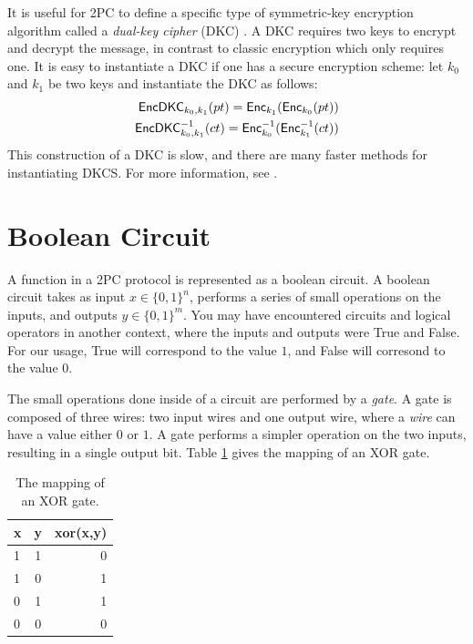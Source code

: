 It is useful for 2PC to define a specific type of symmetric-key encryption algorithm called a \textit{dual-key cipher} (DKC) \cite{bellare2012foundations}.
A DKC requires two keys to encrypt and decrypt the message, in contrast to classic encryption which only requires one.
It is easy to instantiate a DKC if one has a secure encryption scheme: let $k_0$ and $k_1$ be two keys and instantiate the DKC as follows:
\begin{equation}
    \begin{split}
        \textsf{EncDKC}_{k_0, k_1}(pt) = \textsf{Enc}_{k_1} ( \textsf{Enc}_{k_0} ( pt )) \\
        \textsf{EncDKC}^{-1}_{k_0, k_1}(ct) = \textsf{Enc}^{-1}_{k_0} ( \textsf{Enc}^{-1}_{k_1} ( ct )) 
    \end{split}
\end{equation}
This construction of a DKC is slow, and there are many faster methods for instantiating DKCS.
For more information, see \cite{bellare2012foundations}.

\section{Boolean Circuit} 
A function in a 2PC protocol is represented as a boolean circuit.
A boolean circuit takes as input $x \in \{0,1\}^n$, performs a series of small operations on the inputs, and outputs $y \in \{0,1\}^m$.  
You may have encountered circuits and logical operators in another context, where the inputs and outputs were True and False.
For our usage, True will correspond to the value $1$, and False will corresond to the value $0$. 

The small operations done inside of a circuit are performed by a \emph{gate}.
A gate is composed of three wires: two input wires and one output wire, where a \emph{wire} can have a value either $0$ or $1$.
A gate performs a simpler operation on the two inputs, resulting in a single output bit.
Table \ref{tab:xor} gives the mapping of an XOR gate.

\begin{table}[h]
\label{tab:xor}
\centering
\begin{tabular}{ | l | c || r |}
\hline
x & y & xor(x,y) \\ \hline
1 & 1 & 0 \\ \hline
1 & 0 & 1 \\ \hline
0 & 1 & 1 \\ \hline
0 & 0 & 0 \\ \hline
\end{tabular}
\caption{The mapping of an XOR gate.}
\end{table}

